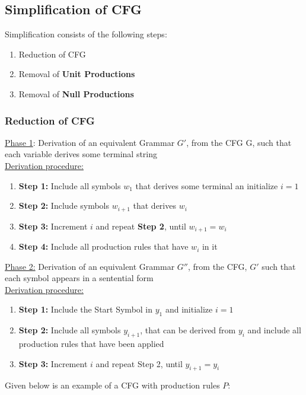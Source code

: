 \documentclass[20pt]{article} %
\begin{document}
\subsection{Simplification of CFG}
Simplification consists of the following steps:
\begin{enumerate}
\item Reduction of CFG
\item Removal of \textbf{Unit Productions}
\item Removal of \textbf{Null Productions}
\end{enumerate}
\subsubsection{Reduction of CFG}
\underline{Phase 1}: Derivation of an equivalent Grammar $G'$, from the CFG G, such that each variable derives some terminal string\\
\underline{Derivation procedure:}
\begin{enumerate}
\item \textbf{Step 1:} Include all symbols $w_1$ that derives some terminal an initialize $i = 1$
\item \textbf{Step 2:} Include symbols $w_{i+1}$ that derives $w_i$
\item \textbf{Step 3:} Increment $i$ and repeat \textbf{Step 2}, until $w_{i+1} = w_i$
\item \textbf{Step 4:} Include all production rules that have $w_i$ in it
\end{enumerate} 
\underline{Phase 2:} Derivation of an equivalent Grammar $G''$, from the CFG, $G'$ such that each symbol appears in a sentential form\\
\underline{Derivation procedure:}
\begin{enumerate}
\item \textbf{Step 1:} Include the Start Symbol in $y_1$ and initialize $i = 1$
\item \textbf{Step 2:} Include all symbols $y_{i+1}$, that can be derived from $y_i$ and include all production rules that have been applied
\item \textbf{Step 3:} Increment $i$ and repeat Step 2, until $y_{i+1} = y_i$
\end{enumerate}
Given below is an example of a CFG with production rules $P$:
\end{document}
